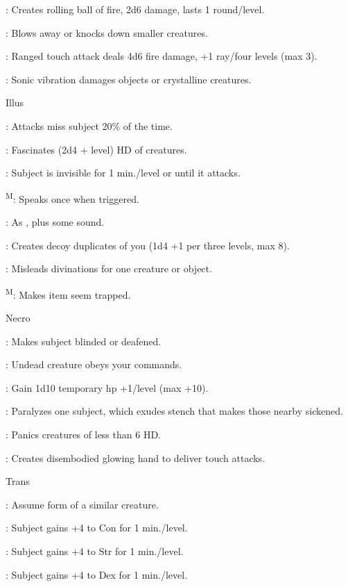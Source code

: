 : Creates rolling ball of fire, 2d6 damage, lasts 1 round/level.

: Blows away or knocks down smaller creatures.

: Ranged touch attack deals 4d6 fire damage, +1 ray/four levels (max 3).

: Sonic vibration damages objects or crystalline creatures.

Illus

: Attacks miss subject 20\% of the time.

: Fascinates (2d4 + level) HD of creatures.

: Subject is invisible for 1 min./level or until it attacks.

\textsuperscript{M}: Speaks once when triggered.

: As , plus some sound.

: Creates decoy duplicates of you (1d4 +1 per three levels, max 8).

: Misleads divinations for one creature or object.

\textsuperscript{M}: Makes item seem trapped.

Necro

: Makes subject blinded or deafened.

: Undead creature obeys your commands.

: Gain 1d10 temporary hp +1/level (max +10).

: Paralyzes one subject, which exudes stench that makes those nearby sickened.

: Panics creatures of less than 6 HD.

: Creates disembodied glowing hand to deliver touch attacks.

Trans

: Assume form of a similar creature.

: Subject gains +4 to Con for 1 min./level.

: Subject gains +4 to Str for 1 min./level.

: Subject gains +4 to Dex for 1 min./level.

